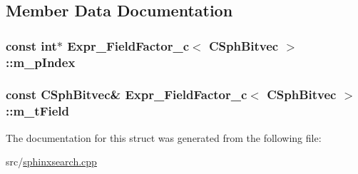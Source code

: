 \subsection{Member Data Documentation}
\hypertarget{structExpr__FieldFactor__c_3_01CSphBitvec_01_4_a552f3a1ef3d679103fd010ae2f1e2f92}{
\subsubsection[{m\-\_\-p\-Index}]{\setlength{\rightskip}{0pt plus 5cm}const {\bf int}$\ast$ {\bf Expr\-\_\-\-Field\-Factor\-\_\-c}$<$ {\bf C\-Sph\-Bitvec} $>$\-::m\-\_\-p\-Index}}\label{structExpr__FieldFactor__c_3_01CSphBitvec_01_4_a552f3a1ef3d679103fd010ae2f1e2f92}
\hypertarget{structExpr__FieldFactor__c_3_01CSphBitvec_01_4_a8b48fe84f53fb9d687047640d68451df}{
\subsubsection[{m\-\_\-t\-Field}]{\setlength{\rightskip}{0pt plus 5cm}const {\bf C\-Sph\-Bitvec}\& {\bf Expr\-\_\-\-Field\-Factor\-\_\-c}$<$ {\bf C\-Sph\-Bitvec} $>$\-::m\-\_\-t\-Field}}\label{structExpr__FieldFactor__c_3_01CSphBitvec_01_4_a8b48fe84f53fb9d687047640d68451df}


The documentation for this struct was generated from the following file\-:\begin{DoxyCompactItemize}
\item 
src/\hyperlink{sphinxsearch_8cpp}{sphinxsearch.\-cpp}\end{DoxyCompactItemize}
